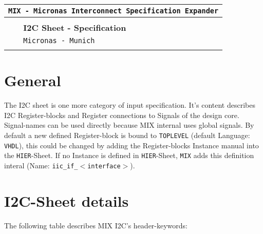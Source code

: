 \documentclass[a4paper,12pt]{report}
\begin{document}
\begin{titlepage}
\vspace*{70mm}
\centering
\begin{tabular}{p{20mm}l}
\multicolumn{2}{r}{\tt {MIX} - Micronas Interconnect Specification Expander}\\[1mm]
\hline \\[3mm]
&{\bf I2C Sheet - Specification}\\[5mm]
&{\tt Micronas - Munich}\\[5mm]
\hline \\[20mm]
\end{tabular}
\end{titlepage}


\raggedright

\section{General}
The I2C sheet is one more category of input specification. It's content describes I2C Register-blocks and Register connections to Signals of the design core. Signal-names can be used directly because MIX internal uses global signals. By default a new defined Register-block is bound to {\tt TOPLEVEL} (default Language: {\tt VHDL}), this could be changed by adding the Register-blocks Instance manual into the {\tt HIER}-Sheet. If no Instance is defined in {\tt HIER}-Sheet, {\tt MIX} adds this definition interal (Name: {\tt iic_if_$<$interface$>$}).

\section{I2C-Sheet details}
The following table describes MIX I2C's header-keywords:
\end{document}
